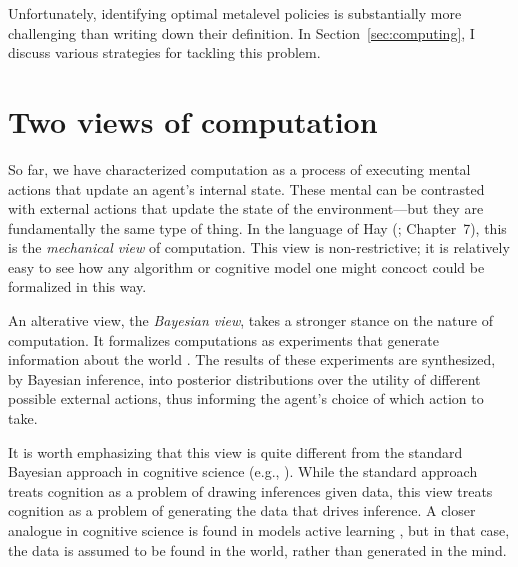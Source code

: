 Unfortunately, identifying optimal metalevel policies is substantially more challenging than writing down their definition. In Section~\ref{sec:computing}, I discuss various strategies for tackling this problem.


\section{Two views of computation}\label{sec:two-views}

So far, we have characterized computation as a process of executing mental actions that update an agent's internal state. These mental can be contrasted with external actions that update the state of the environment---but they are fundamentally the same type of thing. In the language of Hay (\citeyear{hay2016principles}; Chapter~7), this is the \emph{mechanical view} of computation. This view is non-restrictive; it is relatively easy to see how any algorithm or cognitive model one might concoct could be formalized in this way.

An alterative view, the \emph{Bayesian view}, takes a stronger stance on the nature of computation. It formalizes computations as experiments that generate information about the world \citep{matheson1968economic}. The results of these experiments are synthesized, by Bayesian inference, into posterior distributions over the utility of different possible external actions, thus informing the agent's choice of which action to take. 

It is worth emphasizing that this view is quite different from the standard Bayesian approach in cognitive science (e.g., \citealp{tenenbaum2011how}). While the standard approach treats cognition as a problem of drawing inferences given data, this view treats cognition as a problem of generating the data that drives inference. A closer analogue in cognitive science is found in models active learning \citep{gureckis2012selfdirected,gottlieb2013informationseeking}, but in that case, the data is assumed to be found in the world, rather than generated in the mind.

